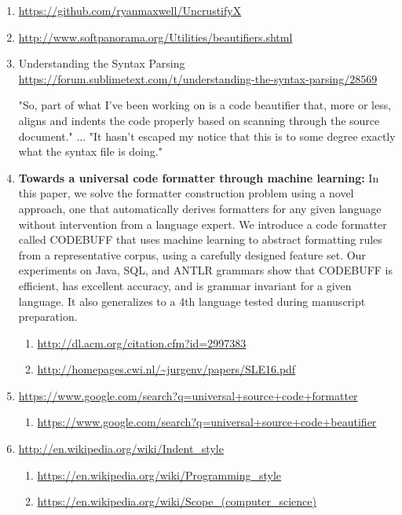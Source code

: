 \begin{englishtext}
\begin{sloppypar}
\begin{bluebox}
\begin{enumerate}[leftmargin=*,parsep=0pt]
    \item \url{https://github.com/ryanmaxwell/UncrustifyX}

    \item \url{http://www.softpanorama.org/Utilities/beautifiers.shtml}

    \item Understanding the Syntax Parsing
    \url{https://forum.sublimetext.com/t/understanding-the-syntax-parsing/28569}

    "So, part of what I've been working on is a code beautifier that, more or less, aligns and
    indents the code properly based on scanning through the source document."
    ...
    "It hasn't escaped my notice that this is to some degree exactly what the syntax file is doing."

    \item

    {\bfseries Towards a universal code formatter through machine learning:}
    In this paper, we solve the formatter construction problem using a novel approach, one that
    automatically derives formatters for any given language without intervention from a language
    expert. We introduce a code formatter called CODEBUFF that uses machine learning to abstract
    formatting rules from a representative corpus, using a carefully designed feature set. Our
    experiments on Java, SQL, and ANTLR grammars show that CODEBUFF is efficient, has excellent
    accuracy, and is grammar invariant for a given language. It also generalizes to a 4th language
    tested during manuscript preparation.
    \begin{enumerate}[nolistsep,topsep=0pt,label=$\star$]
        \item \url{http://dl.acm.org/citation.cfm?id=2997383}
        \item \url{http://homepages.cwi.nl/~jurgenv/papers/SLE16.pdf}
    \end{enumerate}

    \item \url{https://www.google.com/search?q=universal+source+code+formatter}
    \begin{enumerate}[nolistsep,topsep=0pt,label=$\star$]
        \item \url{https://www.google.com/search?q=universal+source+code+beautifier}
    \end{enumerate}

    \item \url{http://en.wikipedia.org/wiki/Indent_style}
    \begin{enumerate}[nolistsep,topsep=0pt,label=$\star$]
        \item \url{https://en.wikipedia.org/wiki/Programming_style}
        \item \url{https://en.wikipedia.org/wiki/Scope_(computer_science)}
    \end{enumerate}


\end{enumerate}
\end{bluebox}
\end{sloppypar}
\end{englishtext}
